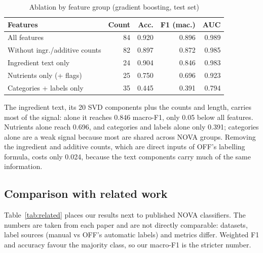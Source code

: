 \documentclass[conference]{IEEEtran}
\begin{document}
\begin{table}[t]
\centering
\caption{Ablation by feature group (gradient boosting, test set)}
\label{tab:ablation}
\begin{tabular}{lrrrr}
\toprule
Features & Count & Acc. & F1 (mac.) & AUC \\
\midrule
All features & 84 & 0.920 & 0.896 & 0.989 \\
Without ingr./additive counts & 82 & 0.897 & 0.872 & 0.985 \\
Ingredient text only & 24 & 0.904 & 0.846 & 0.983 \\
Nutrients only (+ flags) & 25 & 0.750 & 0.696 & 0.923 \\
Categories + labels only & 35 & 0.445 & 0.391 & 0.794 \\
\bottomrule
\end{tabular}
\end{table}

The ingredient text, its 20 SVD components plus the counts and length, carries most of the signal: alone it reaches 0.846 macro-F1, only 0.05 below all features. Nutrients alone reach 0.696, and categories and labels alone only 0.391; categories alone are a weak signal because most are shared across NOVA groups. Removing the ingredient and additive counts, which are direct inputs of OFF's labelling formula, costs only 0.024, because the text components carry much of the same information.

\subsection{Comparison with related work}
Table~\ref{tab:related} places our results next to published NOVA classifiers. The numbers are taken from each paper and are not directly comparable: datasets, label sources (manual vs OFF's automatic labels) and metrics differ. Weighted F1 and accuracy favour the majority class, so our macro-F1 is the stricter number.
\end{document}
